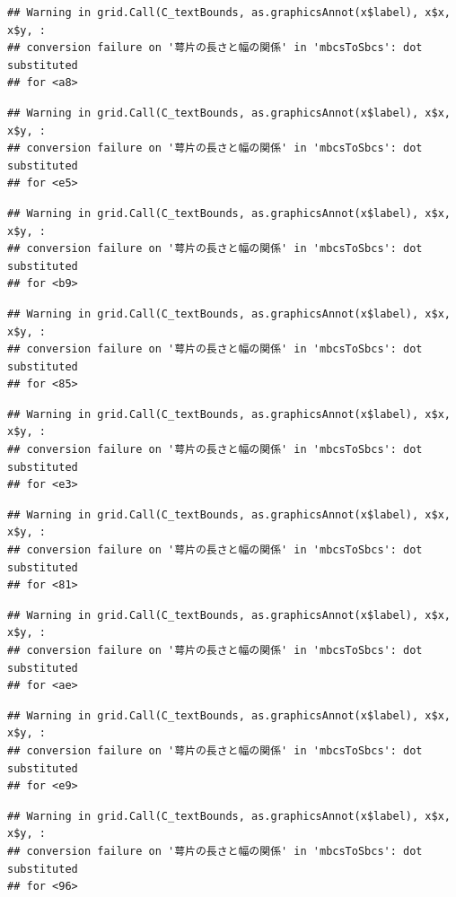 \documentclass[
]{book}
\begin{document}
\begin{verbatim}
## Warning in grid.Call(C_textBounds, as.graphicsAnnot(x$label), x$x, x$y, :
## conversion failure on '萼片の長さと幅の関係' in 'mbcsToSbcs': dot substituted
## for <a8>
\end{verbatim}

\begin{verbatim}
## Warning in grid.Call(C_textBounds, as.graphicsAnnot(x$label), x$x, x$y, :
## conversion failure on '萼片の長さと幅の関係' in 'mbcsToSbcs': dot substituted
## for <e5>
\end{verbatim}

\begin{verbatim}
## Warning in grid.Call(C_textBounds, as.graphicsAnnot(x$label), x$x, x$y, :
## conversion failure on '萼片の長さと幅の関係' in 'mbcsToSbcs': dot substituted
## for <b9>
\end{verbatim}

\begin{verbatim}
## Warning in grid.Call(C_textBounds, as.graphicsAnnot(x$label), x$x, x$y, :
## conversion failure on '萼片の長さと幅の関係' in 'mbcsToSbcs': dot substituted
## for <85>
\end{verbatim}

\begin{verbatim}
## Warning in grid.Call(C_textBounds, as.graphicsAnnot(x$label), x$x, x$y, :
## conversion failure on '萼片の長さと幅の関係' in 'mbcsToSbcs': dot substituted
## for <e3>
\end{verbatim}

\begin{verbatim}
## Warning in grid.Call(C_textBounds, as.graphicsAnnot(x$label), x$x, x$y, :
## conversion failure on '萼片の長さと幅の関係' in 'mbcsToSbcs': dot substituted
## for <81>
\end{verbatim}

\begin{verbatim}
## Warning in grid.Call(C_textBounds, as.graphicsAnnot(x$label), x$x, x$y, :
## conversion failure on '萼片の長さと幅の関係' in 'mbcsToSbcs': dot substituted
## for <ae>
\end{verbatim}

\begin{verbatim}
## Warning in grid.Call(C_textBounds, as.graphicsAnnot(x$label), x$x, x$y, :
## conversion failure on '萼片の長さと幅の関係' in 'mbcsToSbcs': dot substituted
## for <e9>
\end{verbatim}

\begin{verbatim}
## Warning in grid.Call(C_textBounds, as.graphicsAnnot(x$label), x$x, x$y, :
## conversion failure on '萼片の長さと幅の関係' in 'mbcsToSbcs': dot substituted
## for <96>
\end{verbatim}
\end{document}
